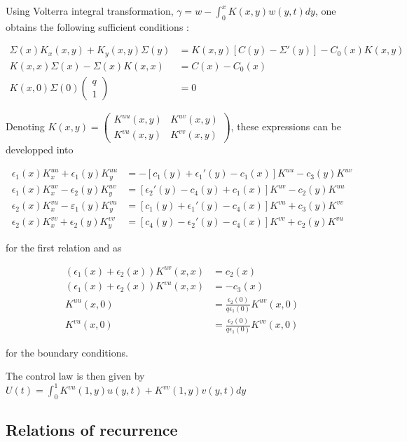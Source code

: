 \documentclass[11pt,a4paper]{article}
\begin{document}
Using Volterra integral transformation, $\gamma = w - \int_{0}^{x}K(x,y)w(y,t) dy$, one obtains the following sufficient conditions : 

\begin{align*}
  \Sigma(x)K_x(x,y) + K_y(x,y)\Sigma(y) &= K(x,y)\left[C(y)-\Sigma'(y)\right]-C_0(x)K(x,y) \\
  K(x,x)\Sigma(x) - \Sigma(x)K(x,x) &= C(x) - C_0(x) \\
  K(x,0)\Sigma(0)\begin{pmatrix}
    q \\ 1
  \end{pmatrix} &= 0
\end{align*}

Denoting $K(x,y) = \begin{pmatrix}
  K^{uu}(x,y) & K^{uv}(x,y) \\
  K^{vu}(x,y) & K^{vv}(x,y)
\end{pmatrix}$, these expressions can be developped into 

\begin{align}
  \epsilon_1(x)K^{uu}_x + \epsilon_1(y)K^{uu}_y &= -\left[c_1(y)+\epsilon_1'(y)-c_1(x)\right]K^{uu} - c_3(y)K^{uv} \\
  \epsilon_1(x)K^{uv}_x -\epsilon_2(y)K^{uv}_y &= \left[\epsilon_2'(y)-c_4(y)+c_1(x)\right]K^{uv} -c_2(y)K^{uu} \\
  \epsilon_2(x)K^{vu}_x - \varepsilon_1(y)K^{vu}_y &= \left[c_1(y) + \epsilon_1'(y)-c_4(x)\right]K^{vu} + c_3(y)K^{vv} \\
  \epsilon_2(x)K^{vv}_x + \epsilon_2(y)K^{vv}_y &= \left[c_4(y)-\epsilon_2'(y)-c_4(x)\right]K^{vv}+ c_2(y)K^{vu}
\end{align}

for the first relation and as

\begin{align}
  (\epsilon_1(x) + \epsilon_2(x))K^{uv}(x,x) &= c_2(x) \\
  (\epsilon_1(x) + \epsilon_2(x))K^{vu}(x,x) &= -c_3(x) \\
  K^{uu}(x,0) &= \frac{\epsilon_2(0)}{q\epsilon_1(0)}K^{uv}(x,0) \\
  K^{vu}(x,0) &= \frac{\epsilon_2(0)}{q\epsilon_1(0)}K^{vv}(x,0) 
\end{align}

for the boundary conditions. 

The control law is then given by $U(t) = \int_{0}^{1}K^{vu}(1,y)u(y,t) + K^{vv}(1,y)v(y,t) dy$

\subsection{Relations of recurrence}
\end{document}

